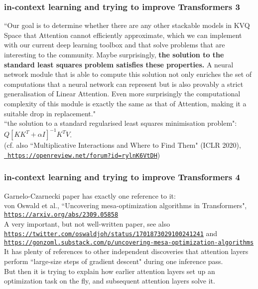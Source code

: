 \documentclass{beamer}
\begin{document}
\begin{frame}

  \frametitle{in-context learning and trying to improve Transformers 3}

{\scriptsize ``Our goal is to determine whether there are any other stackable models in KVQ Space that Attention cannot efficiently approximate, which we can implement with our current deep learning toolbox and that solve problems that are interesting to the community. Maybe surprisingly, {\bf the solution to the standard least squares problem satisfies these properties.} A neural network module that is able to compute this solution not only enriches the set of computations that a neural network can represent but is also provably a strict generalisation of Linear Attention. Even more surprisingly the computational complexity of this module is exactly the same as that of Attention, making it a suitable drop in replacement."}\\[2ex]

``the solution to
a standard regularised least squares minimisation problem": $Q[KK^T + \alpha I]^{-1}K^TV$.\\[2ex]

{\scriptsize (cf. also ``Multiplicative Interactions and Where to Find Them" (ICLR 2020),  
\href{https://openreview.net/forum?id=rylnK6VtDH}{\tt\ https://openreview.net/forum?id=rylnK6VtDH})} 

\end{frame}

\begin{frame}

  \frametitle{in-context learning and trying to improve Transformers 4}

Garnelo-Czarnecki paper has exactly one reference to it:\\[2ex]

von Oswald et al., ``Uncovering mesa-optimization algorithms in Transformers",
\href{https://arxiv.org/abs/2309.05858}{\tt\small https://arxiv.org/abs/2309.05858}\\[2ex]

A very important, but not well-written paper, see also
\href{https://twitter.com/oswaldjoh/status/1701873029100241241}{\tt\footnotesize https://twitter.com/oswaldjoh/status/1701873029100241241} and\\
\href{https://gonzoml.substack.com/p/uncovering-mesa-optimization-algorithms}{\tt\footnotesize https://gonzoml.substack.com/p/uncovering-mesa-optimization-algorithms}\\[2ex]

It has plenty of references to other independent discoveries that attention layers perform
``large-size steps of gradient descent" during one inference pass.\\[2ex]

But then it is trying to explain how earlier attention layers set up an optimization task
on the fly, and subsequent attention layers solve it.

\end{frame}
\end{document}
